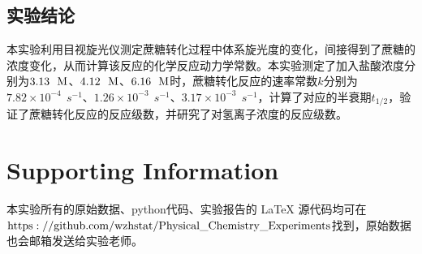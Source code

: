 \documentclass[12pt]{article}
\begin{document}
				\subsection{实验结论}
				本实验利用目视旋光仪测定蔗糖转化过程中体系旋光度的变化，间接得到了蔗糖的浓度变化，从而计算该反应的化学反应动力学常数。本实验测定了加入盐酸浓度分别为$3.13\ \ {\rm M}$、$4.12\ \ {\rm M}$、$6.16\ \ {\rm M}$时，蔗糖转化反应的速率常数$k$分别为$7.82\times10^{-4}\ \ s^{-1}$、$1.26\times10^{-3}\ \ s^{-1}$、$3.17\times10^{-3}\ \ s^{-1}$，计算了对应的半衰期$t_{1/2}$，验证了蔗糖转化反应的反应级数，并研究了对氢离子浓度的反应级数。


					



	\vbox{}
	\section{Supporting Information}
		本实验所有的原始数据、python代码、实验报告的 LaTeX 源代码均可在 $\rm{https://github.com/wzhstat/Physical\_Chemistry\_Experiments}$找到，原始数据也会邮箱发送给实验老师。
\vbox{}  


\end{document}
